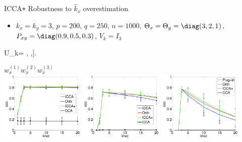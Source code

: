 \documentclass[8pt]{beamer}
\newcommand{\Pxy}{P_{xy}}
\newcommand{\kx}{k_x}
\newcommand{\ky}{k_y}
\newcommand{\kxhat}{\widehat{k}_x}
\newcommand{\Tx}{\Theta_x}
\newcommand{\Ty}{\Theta_y}
\newcommand{\iccap}{ICCA\texttt{+} }
\begin{document}
\begin{frame}{\iccap Robustness to $\kxhat$ overestimation}

\begin{itemize}
\item $\kx=\ky=3$, $p=200$, $q=250$, $n=1000$,
$\Tx=\Ty=\diag(3,2,1)$, $\Pxy=\diag(0.9,0.5,0.3)$, $V_k=I_3$
\end{itemize}

\vspace{2ex}

\be
U_k= \left[\frac{1}{\sqrt{3}}\left[\begin{array}{c} 1\\ 1\\1\end{array}\right],
    \left[\begin{array}{c} 1\\
        0\\-1\end{array}\right],\left[\begin{array}{c} 1\\
        -2\\1\end{array}\right]\right]. 
\ee

\vspace{2ex}

\begin{center}
  \textbf{$w_x^{(1)}$}\hspace{22ex}\textbf{$w_x^{(2)}$}\hspace{22ex}\textbf{$w_x^{(3)}$}\\
    \includegraphics[width=0.3\textwidth]{figures/icca_vect_khat1_1.pdf}\hspace{2ex}
    \includegraphics[width=0.3\textwidth]{figures/icca_vect_khat1_2.pdf}\hspace{2ex}
    \includegraphics[width=0.3\textwidth]{figures/icca_vect_khat1_3.pdf}
  \end{center}

\end{frame}
\end{document}
